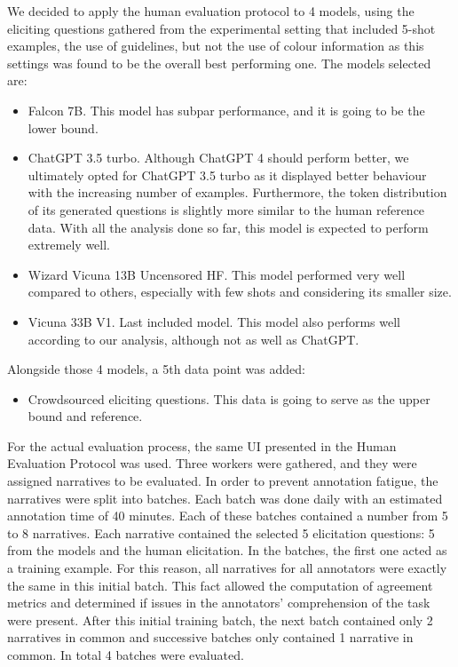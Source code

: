 We decided to apply the human evaluation protocol to 4 models, using the eliciting questions gathered from the experimental setting that included 5-shot examples, the use of guidelines, but not the use of colour information as this settings was found to be the overall best performing one. The models selected are:
\begin{itemize}
\item Falcon 7B. This model has subpar performance, and it is going to be the lower bound.
    \item ChatGPT 3.5 turbo. Although ChatGPT 4 should perform better, we ultimately opted for ChatGPT 3.5 turbo as it displayed better behaviour with the increasing number of examples. Furthermore, the token distribution of its generated questions is slightly more similar to the human reference data. With all the analysis done so far, this model is expected to perform extremely well.
    \item Wizard Vicuna 13B Uncensored HF. This model performed very well compared to others, especially with few shots and considering its smaller size.
    \item Vicuna 33B V1. Last included model. This model also performs well according to our analysis, although not as well as ChatGPT.
\end{itemize}
Alongside those 4 models, a 5th data point was added:
\begin{itemize}
    \item Crowdsourced eliciting questions. This data is going to serve as the upper bound and reference.
\end{itemize}

For the actual evaluation process, the same UI presented in the Human Evaluation Protocol was used. %
Three workers were gathered, and they were assigned narratives to be evaluated.  
In order to prevent annotation fatigue, the narratives were split into batches. Each batch was done daily with an estimated annotation time of 40 minutes. Each of these batches contained a number from 5 to 8 narratives. Each narrative contained the selected 5 elicitation questions: 5 from the models and the human elicitation. In the batches, the first one acted as a training example. For this reason, all narratives for all annotators were exactly the same in this initial batch. This fact allowed the computation of agreement metrics and determined if issues in the annotators' comprehension of the task were present. After this initial training batch, the next batch contained only 2 narratives in common and successive batches only contained 1 narrative in common. In total 4 batches were evaluated.

